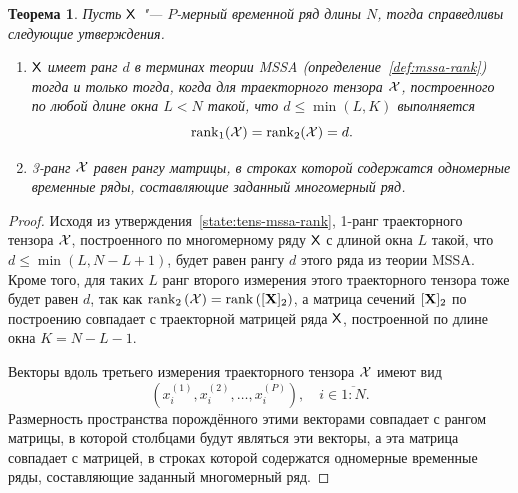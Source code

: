 \documentclass[specialist,
  substylefile=spbu.rtx,
subf,href,colorlinks=true, 12pt]{disser}
\theoremstyle{plain}
\newtheorem{theorem}{Теорема}
\theoremstyle{definition}
\newtheorem{definition}{Определение}[section]
\theoremstyle{remark}
\begin{document}
\begin{theorem}
  \label{state:hosvd-mssa-rang}
  Пусть $\mathsf{X}$ "--- $P$-мерный временной ряд длины $N$, тогда справедливы следующие утверждения.
  \begin{enumerate}
    \item $\mathsf{X}$ имеет ранг $d$ в терминах теории \emph{MSSA} (определение~\ref{def:mssa-rank})
      тогда и только тогда, когда для траекторного тензора $\mathcal{X}$, построенного по любой длине окна
      $L<N$ такой, что $d \leqslant\min(L, K)$ выполняется
      \[\operatorname{rank}_1(\mathcal{X}) = \operatorname{rank}_2(\mathcal{X}) = d.\]
    \item 3-ранг $\mathcal{X}$ равен рангу матрицы,
      в строках которой содержатся одномерные временные ряды, составляющие заданный
      многомерный ряд.
  \end{enumerate}
\end{theorem}
\begin{proof}
  Исходя из утверждения~\ref{state:tens-mssa-rank}, 1-ранг
  траекторного тензора $\mathcal{X}$, построенного по многомерному ряду $\mathsf{X}$ с длиной окна
  $L$ такой, что $d \leqslant\min(L, N-L+1)$,
  будет равен рангу $d$ этого ряда из теории MSSA.
  Кроме того, для таких $L$ ранг второго измерения этого траекторного тензора
  тоже будет равен $d$, так как $\operatorname{rank}_2\left(\mathcal{X}\right) =
  \operatorname{rank}\left([\mathbf{X}]_2\right)$,
  а матрица сечений $[\mathbf{X}]_2$ по построению совпадает с траекторной матрицей ряда $\mathsf{X}$, построенной по длине
  окна $K = N - L - 1$.

  Векторы вдоль третьего измерения траекторного тензора $\mathcal{X}$ имеют вид
  \[
    \left(x_i^{(1)}, x_i^{(2)}, \ldots, x_i^{(P)}\right), \quad i \in \overline{1:N}.
  \]
  Размерность пространства порождённого этими векторами совпадает с рангом матрицы,
  в которой столбцами будут являться эти векторы, а эта матрица совпадает с матрицей, в строках которой содержатся одномерные временные ряды, составляющие заданный многомерный ряд.
\end{proof}
\end{document}
